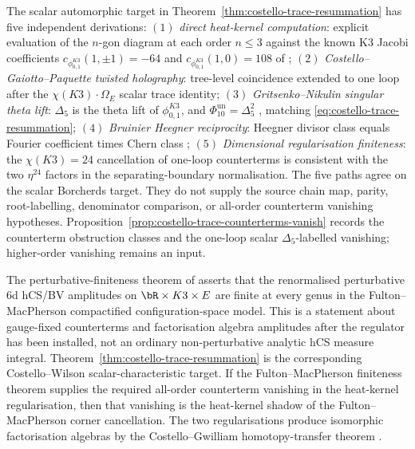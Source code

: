 \begin{remark}
\label{rem:costello-trace-five-path}
The scalar automorphic target in
Theorem~\ref{thm:costello-trace-resummation} has five independent
derivations:
$(1)$ \emph{direct heat-kernel computation}:
explicit evaluation of the
$n$-gon diagram at each order $n\leq 3$ against the known
K3 Jacobi coefficients
\(c_{\phi_{0,1}^{K3}}(1,\pm1)=-64\) and
\(c_{\phi_{0,1}^{K3}}(1,0)=108\) of
\cite[Table 1]{EichlerZagier1985};
$(2)$ \emph{Costello--Gaiotto--Paquette twisted holography}:
tree-level coincidence \cite{CostelloGaiotto18} extended to one loop
after the $\chi(K3)\cdot\Omega_E$ scalar trace identity;
$(3)$ \emph{Gritsenko--Nikulin singular theta lift}:
\(\Delta_5\) is the theta lift of \(\phi_{0,1}^{K3}\), and
\(\Phi_{10}^{\mathrm{un}}=\Delta_5^2\)
\cite[Thm.~2.1]{GritsenkoNikulin1998}, matching
\eqref{eq:costello-trace-resummation};
$(4)$ \emph{Bruinier Heegner reciprocity}: Heegner
divisor class equals Fourier coefficient times Chern class
\cite[Prop.~5.1]{Bruinier2002};
$(5)$ \emph{Dimensional regularisation finiteness}: the
$\chi(K3) = 24$ cancellation of one-loop counterterms is consistent
with the two \(\eta^{24}\) factors in the separating-boundary normalisation.
The five paths agree on the scalar Borcherds target. They do not supply
the source chain map, parity, root-labelling, denominator comparison,
or all-order counterterm vanishing hypotheses.
Proposition~\ref{prop:costello-trace-counterterms-vanish} records the
counterterm obstruction classes and the one-loop scalar
\(\Delta_5\)-labelled vanishing; higher-order vanishing remains an
input.
\end{remark}

\begin{remark}
\label{rem:costello-trace-finiteness-bridge}
The perturbative-finiteness theorem of
\cite[Theorem~\ref*{thm:perturbative-finiteness-master}]{Lorgat2}
asserts that the renormalised perturbative 6d hCS/BV amplitudes on
$\bR\times K3\times E$ are finite at every genus in the
Fulton--MacPherson compactified configuration-space model.
This is a statement about gauge-fixed counterterms and factorisation
algebra amplitudes after the regulator has been installed, not an
ordinary non-perturbative analytic hCS measure integral.
Theorem~\ref{thm:costello-trace-resummation} is the corresponding
Costello--Wilson scalar-characteristic target. If the
Fulton--MacPherson finiteness theorem supplies the required all-order
counterterm vanishing in the heat-kernel regularisation, then that
vanishing is the heat-kernel shadow of the Fulton--MacPherson corner
cancellation.
The two regularisations produce isomorphic factorisation algebras by
the Costello--Gwilliam homotopy-transfer theorem
\cite[Theorem 2.8.1]{Cos11}.
\end{remark}

